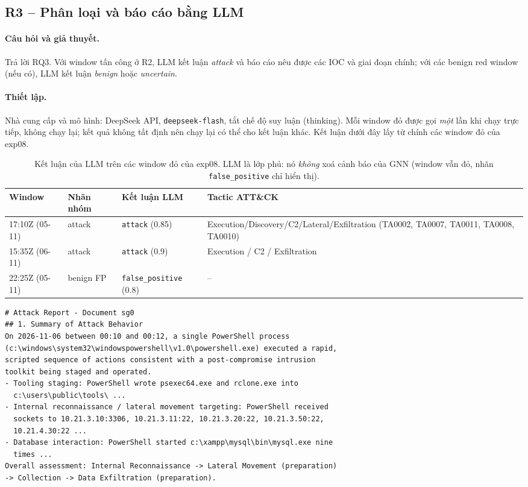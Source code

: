 \subsection{R3 -- Phân loại và báo cáo bằng LLM}
\label{sec:res-llm}

\paragraph{Câu hỏi và giả thuyết.}
Trả lời RQ3. Với window tấn công ở R2, LLM kết luận \emph{attack} và báo cáo nêu được các IOC và giai đoạn chính; với các benign red window (nếu có), LLM kết luận \emph{benign} hoặc \emph{uncertain}.

\paragraph{Thiết lập.}
Nhà cung cấp và mô hình: DeepSeek API, \texttt{deepseek-flash}, tắt chế độ suy luận (thinking). Mỗi window đỏ được gọi \emph{một} lần khi chạy trực tiếp, không chạy lại; kết quả không tất định nên chạy lại có thể cho kết luận khác. Kết luận dưới đây lấy từ chính các window đỏ của exp08.

\begin{table}[H]
\centering
\small
\begin{tabularx}{\textwidth}{l l l X}
\toprule
\textbf{Window} & \textbf{Nhãn nhóm} & \textbf{Kết luận LLM} & \textbf{Tactic ATT\&CK} \\
\midrule
17:10Z (05-11) & attack & \texttt{attack} (0.85) & Execution/Discovery/C2/Lateral/Exfiltration (TA0002, TA0007, TA0011, TA0008, TA0010) \\
15:35Z (06-11) & attack & \texttt{attack} (0.9) & Execution / C2 / Exfiltration \\
22:25Z (05-11) & benign FP & \texttt{false\_positive} (0.8) & -- \\
\bottomrule
\end{tabularx}
\caption{Kết luận của LLM trên các window đỏ của exp08. LLM là lớp phủ: nó \emph{không} xoá cảnh báo của GNN (window vẫn đỏ, nhãn \texttt{false\_positive} chỉ hiển thị).}
\label{tab:res-llm}
\end{table}

\begin{lstlisting}[caption={Trích nguyên văn (rút gọn) báo cáo do LLM sinh ra cho window 05-11 17:10Z; giờ trong báo cáo là giờ lab UTC+7.}, label={lst:report}, breaklines=true]
# Attack Report - Document sg0
## 1. Summary of Attack Behavior
On 2026-11-06 between 00:10 and 00:12, a single PowerShell process
(c:\windows\system32\windowspowershell\v1.0\powershell.exe) executed a rapid,
scripted sequence of actions consistent with a post-compromise intrusion
toolkit being staged and operated.
- Tooling staging: PowerShell wrote psexec64.exe and rclone.exe into
  c:\users\public\tools\ ...
- Internal reconnaissance / lateral movement targeting: PowerShell received
  sockets to 10.21.3.10:3306, 10.21.3.11:22, 10.21.3.20:22, 10.21.3.50:22,
  10.21.4.30:22 ...
- Database interaction: PowerShell started c:\xampp\mysql\bin\mysql.exe nine
  times ...
Overall assessment: Internal Reconnaissance -> Lateral Movement (preparation)
-> Collection -> Data Exfiltration (preparation).
\end{lstlisting}

